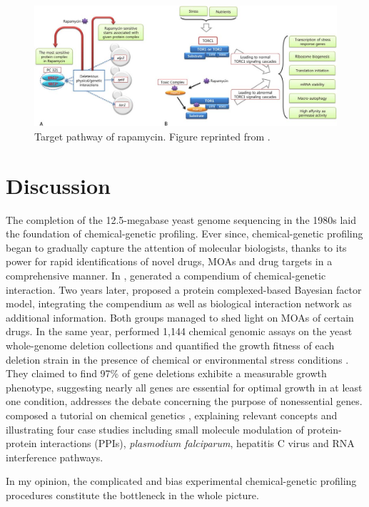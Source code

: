 \documentclass[12pt,fullpage,singlespace]{article}
\begin{document}
\begin{figure}
\centering
\includegraphics[width=\linewidth]{1079-5.png}
\caption{Target pathway of rapamycin. Figure reprinted from \citep{1079}.}
\label{fig:1079-5}
\end{figure}

\section{Discussion}

The completion of the 12.5-megabase yeast genome sequencing in the 1980s laid the foundation of chemical-genetic profiling. Ever since, chemical-genetic profiling began to gradually capture the attention of molecular biologists, thanks to its power for rapid identifications of novel drugs, MOAs and drug targets in a comprehensive manner. In \citeyear{1078},  generated a compendium of chemical-genetic interaction. Two years later,  proposed a protein complexed-based Bayesian factor model, integrating the compendium as well as biological interaction network as additional information. Both groups managed to shed light on MOAs of certain drugs. In the same year,  performed 1,144 chemical genomic assays on the yeast whole-genome deletion collections and quantified the growth fitness of each deletion strain in the presence of chemical or environmental stress conditions \citep{1080}. They claimed to find 97\% of gene deletions exhibite a measurable growth phenotype, suggesting nearly all genes are essential for optimal growth in at least one condition, addresses the debate concerning the purpose of nonessential genes.  composed a tutorial on chemical genetics \citep{1103}, explaining relevant concepts and illustrating four case studies including small molecule modulation of protein-protein interactions (PPIs), \textit{plasmodium falciparum}, hepatitis C virus and RNA interference pathways.

In my opinion, the complicated and bias experimental chemical-genetic profiling procedures constitute the bottleneck in the whole picture. 
\end{document}
